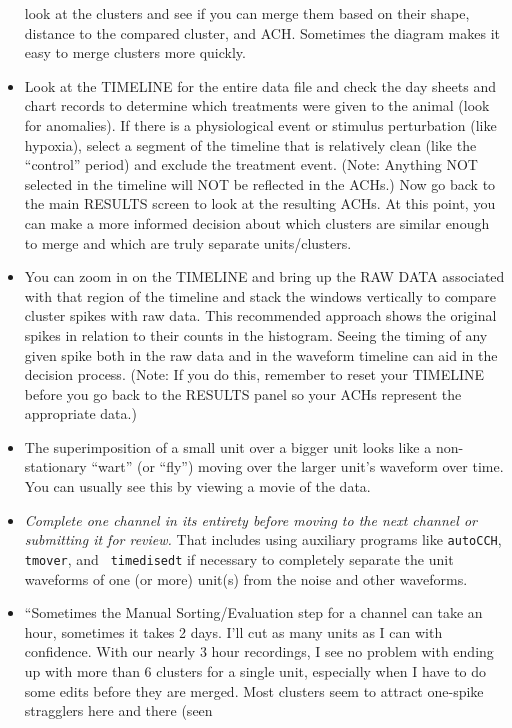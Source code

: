 \documentclass[12pt]{article}
\begin{document}
\begin{itemize}
  look at the clusters and see if you can merge them based on their
  shape, distance to the compared cluster, and ACH. Sometimes the
  diagram makes it easy to merge clusters more quickly.
\item Look at the \textsf{TIMELINE} for the entire data file and check
  the day sheets and chart records to determine which treatments were
  given to the animal (look for anomalies). If there is a
  physiological event or stimulus perturbation (like hypoxia), select
  a segment of the timeline that is relatively clean (like the
  ``control'' period) and exclude the treatment event. (Note: Anything
  NOT selected in the timeline will NOT be reflected in the ACHs.) Now
  go back to the main \textsf{RESULTS} screen to look at the resulting
  ACHs. At this point, you can make a more informed decision about
  which clusters are similar enough to merge and which are truly
  separate units/clusters.
\item You can zoom in on the \textsf{TIMELINE} and bring up the
  \textsf{RAW DATA} associated with that region of the timeline and
  stack the windows vertically to compare cluster spikes with raw
  data. This recommended approach shows the original spikes in
  relation to their counts in the histogram. Seeing the timing of any
  given spike both in the raw data and in the waveform timeline can
  aid in the decision process. (Note: If you do this, remember to
  reset your \textsf{TIMELINE} before you go back to the
  \textsf{RESULTS} panel so your ACHs represent the appropriate data.)
\item The superimposition of a small unit over a bigger unit looks
  like a non-stationary ``wart'' (or ``fly'') moving over the larger
  unit's waveform over time. You can usually see this by viewing a
  movie of the data.
\item \textit{Complete one channel in its entirety before moving to
    the next channel or submitting it for review.} That includes using
  auxiliary programs like {\tt autoCCH}, {\tt tmover}, and {\tt
    timedisedt} if necessary to completely separate the unit waveforms
  of one (or more) unit(s) from the noise and other waveforms.
\item ``Sometimes the Manual Sorting/Evaluation step for a channel can
  take an hour, sometimes it takes 2 days. I'll cut as many units as I
  can with confidence. With our nearly 3 hour recordings, I see no
  problem with ending up with more than 6 clusters for a single unit,
  especially when I have to do some edits before they are merged. Most
  clusters seem to attract one-spike stragglers here and there (seen

\end{itemize}
\end{document}
